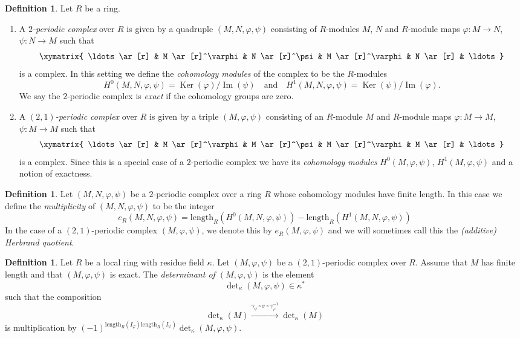 \documentclass[10pt,a4paper]{amsart}
\theoremstyle{plain}
\theoremstyle{definition}
\newtheorem{definition}[subsection]{Definition}
\theoremstyle{remark}
\numberwithin{equation}{subsection}
\def\Ker{\mathop{\mathrm{Ker}}}
\def\Im{\mathop{\mathrm{Im}}}
\begin{document}
\begin{definition}
\label{definition-periodic-complex}
Let $R$ be a ring.
\begin{enumerate}
\item A {\it $2$-periodic complex} over $R$ is given
by a quadruple $(M, N, \varphi, \psi)$ consisting of
$R$-modules $M$, $N$ and $R$-module maps $\varphi : M \to N$,
$\psi : N \to M$ such that
$$
\xymatrix{
\ldots \ar[r] &
M \ar[r]^\varphi &
N \ar[r]^\psi &
M \ar[r]^\varphi &
N \ar[r] & \ldots
}
$$
is a complex. In this setting we define the {\it cohomology modules}
of the complex to be the $R$-modules
$$
H^0(M, N, \varphi, \psi) = \Ker(\varphi)/\Im(\psi)
\quad\text{and}\quad
H^1(M, N, \varphi, \psi) = \Ker(\psi)/\Im(\varphi).
$$
We say the $2$-periodic complex is {\it exact} if the cohomology
groups are zero.
\item A {\it $(2, 1)$-periodic complex} over $R$ is given
by a triple $(M, \varphi, \psi)$ consisting of an $R$-module $M$ and
$R$-module maps $\varphi : M \to M$, $\psi : M \to M$
such that
$$
\xymatrix{
\ldots \ar[r] &
M \ar[r]^\varphi &
M \ar[r]^\psi &
M \ar[r]^\varphi &
M \ar[r] & \ldots
}
$$
is a complex. Since this is a special case of a $2$-periodic complex
we have its {\it cohomology modules} $H^0(M, \varphi, \psi)$,
$H^1(M, \varphi, \psi)$ and a notion of exactness.
\end{enumerate}
\end{definition}

\begin{definition}
\label{definition-periodic-length}
Let $(M, N, \varphi, \psi)$ be a $2$-periodic complex
over a ring $R$ whose cohomology modules have finite length.
In this case we define the {\it multiplicity} of $(M, N, \varphi, \psi)$
to be the integer
$$
e_R(M, N, \varphi, \psi) =
\text{length}_R(H^0(M, N, \varphi, \psi))
-
\text{length}_R(H^1(M, N, \varphi, \psi))
$$
In the case of a $(2, 1)$-periodic complex $(M, \varphi, \psi)$,
we denote this by $e_R(M, \varphi, \psi)$ and we will sometimes call this
the {\it (additive) Herbrand quotient}.
\end{definition}

\begin{definition}
\label{definition-periodic-determinant}
Let $R$ be a local ring with residue field $\kappa$.
Let $(M, \varphi, \psi)$ be a $(2, 1)$-periodic complex over $R$.
Assume that $M$ has finite length and that $(M, \varphi, \psi)$ is
exact. The {\it determinant of $(M, \varphi, \psi)$} is
the element
$$
\det\nolimits_\kappa(M, \varphi, \psi) \in \kappa^*
$$
such that the composition
$$
\det\nolimits_\kappa(M)
\xrightarrow{\gamma_\psi \circ \sigma \circ \gamma_\varphi^{-1}}
\det\nolimits_\kappa(M)
$$
is multiplication by
$(-1)^{\text{length}_R(I_\varphi)\text{length}_R(I_\psi)}
\det\nolimits_\kappa(M, \varphi, \psi)$.
\end{definition}
\end{document}
